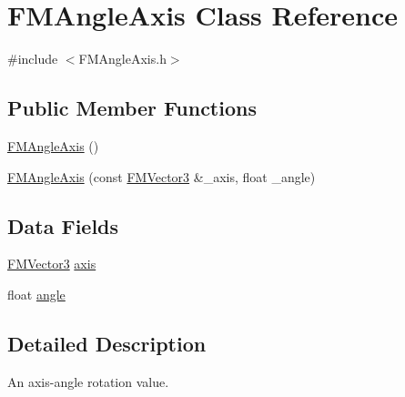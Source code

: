 \hypertarget{classFMAngleAxis}{
\section{FMAngleAxis Class Reference}
\label{classFMAngleAxis}
}


{\ttfamily \#include $<$FMAngleAxis.h$>$}

\subsection*{Public Member Functions}
\begin{DoxyCompactItemize}
\item 
\hyperlink{classFMAngleAxis_a96d6087b312e7a87289e68acf5963fa6}{FMAngleAxis} ()
\item 
\hyperlink{classFMAngleAxis_ac955428debabefe0815a59a7c0bdab8f}{FMAngleAxis} (const \hyperlink{classFMVector3}{FMVector3} \&\_\-axis, float \_\-angle)
\end{DoxyCompactItemize}
\subsection*{Data Fields}
\begin{DoxyCompactItemize}
\item 
\hyperlink{classFMVector3}{FMVector3} \hyperlink{classFMAngleAxis_a266bfd1ab3786362ebdf9519788e26df}{axis}
\item 
float \hyperlink{classFMAngleAxis_a015f65e6030e6c4969a218631d4d63d0}{angle}
\end{DoxyCompactItemize}


\subsection{Detailed Description}
An axis-\/angle rotation value. 

